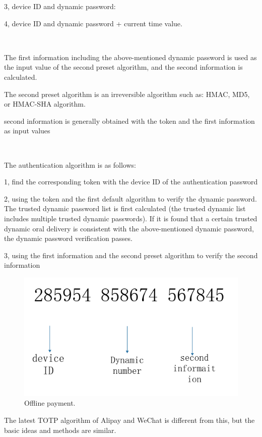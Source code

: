 \documentclass[journal]{IEEEtran}
\begin{document}
3, device ID and dynamic password:

4, device ID and dynamic password + current time value.

\

The first information including the above-mentioned dynamic password is used as the input value of the second preset algorithm, and the second information is calculated.

The second preset algorithm is an irreversible algorithm such as: HMAC, MD5, or HMAC-SHA algorithm.

 second information is generally obtained with the token and the first information as input values

\

The authentication algorithm is as follows:

1, find the corresponding token with the device ID of the authentication password

2, using the token and the first default algorithm to verify the dynamic password.
The trusted dynamic password list is first calculated (the trusted dynamic list includes multiple trusted dynamic passwords).
If it is found that a certain trusted dynamic oral delivery is consistent with the above-mentioned dynamic password, the dynamic password verification passes.

3, using the first information and the second preset algorithm to verify the second information




\begin{figure}[htbp]
\centerline{\includegraphics[scale=0.4]{OTP.png}}
\caption{Offline payment.}
\label{fig}
\end{figure}

The latest TOTP algorithm of Alipay and WeChat is different from this, but the basic ideas and methods are similar.
\end{document}
